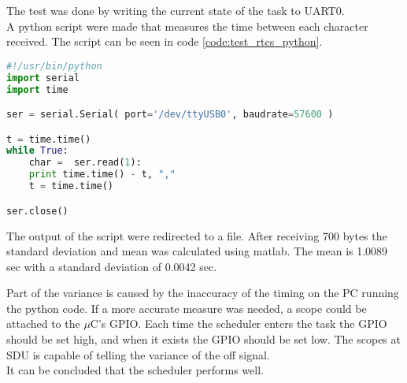 The test was done by writing the current state of the task to UART0.\\ A python script were made that measures the time between each character received. The script can be seen in code \ref{code:test_rtcs_python}.
\begin{lstlisting}[language = python, caption = Python code used to measure time between received byte, label=code:test_rtcs_python]
#!/usr/bin/python
import serial
import time

ser = serial.Serial( port='/dev/ttyUSB0', baudrate=57600 )

t = time.time()
while True:
    char =  ser.read(1):
    print time.time() - t, ","
    t = time.time()

ser.close()
\end{lstlisting}
The output of the script were redirected to a file. After receiving 700 bytes the standard deviation and mean was calculated using matlab.
The mean is 1.0089 sec with a standard deviation of 0.0042 sec.

Part of the variance is caused by the inaccuracy of the timing on the PC running the python code. If a more accurate measure was needed, a scope could be attached to the $\mu$C's GPIO. Each time the scheduler enters the task the GPIO should be set high, and when it exists the GPIO should be set low. The scopes at SDU is capable of telling the variance of the off signal. \\
It can be concluded that the scheduler performs well.

